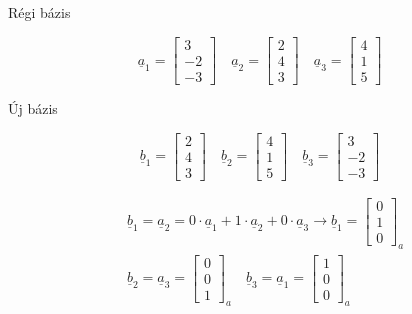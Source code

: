 \subsection{}

Régi bázis

$$
\underline{a}_{1}=\left[\begin{array}{c}
3 \\
-2 \\
-3
\end{array}\right] \quad \underline{a}_{2}=\left[\begin{array}{l}
2 \\
4 \\
3
\end{array}\right] \quad \underline{a}_{3}=\left[\begin{array}{l}
4 \\
1 \\
5
\end{array}\right]
$$

\noindent Új bázis

$$
\underline{b}_{1}=\left[\begin{array}{l}
2 \\
4 \\
3
\end{array}\right] \quad \underline{b}_{2}=\left[\begin{array}{l}
4 \\
1 \\
5
\end{array}\right] \quad \underline{b}_{3}=\left[\begin{array}{c}
3 \\
-2 \\
-3
\end{array}\right]
$$

$$
\begin{aligned}
& \underline{b}_{1}=\underline{a}_{2}=0 \cdot \underline{a}_{1}+1 \cdot \underline{a}_{2}+0 \cdot \underline{a}_{3} \rightarrow \underline{b}_{1}=\left[\begin{array}{l}0 \\1 \\0\end{array}\right]_a \\
& \underline{b}_{2}=\underline{a}_{3}=\left[\begin{array}{l}0 \\0 \\1\end{array}\right]_{a} \quad \underline{b}_{3}=\underline{a}_{1}=\left[\begin{array}{l}1 \\0 \\0\end{array}\right]_a
\end{aligned}
$$

